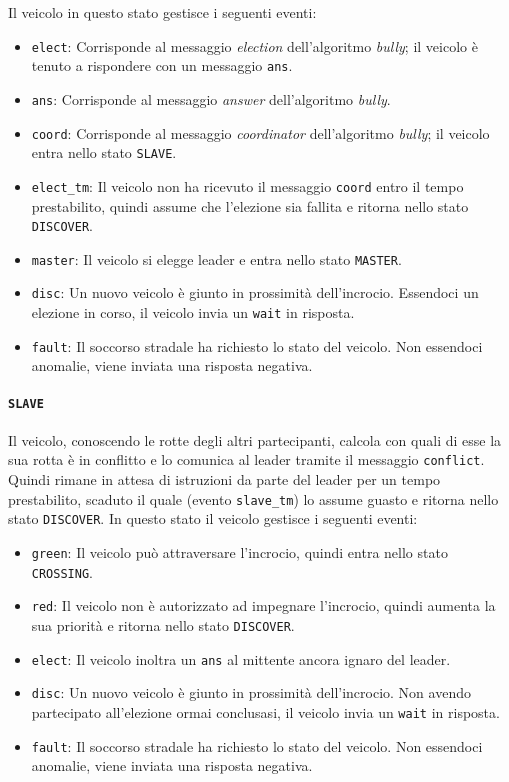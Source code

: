 \documentclass{memoir}
\begin{document}
Il veicolo in questo stato gestisce i seguenti eventi:
\begin{itemize}
\item \texttt{elect}: Corrisponde al messaggio \emph{election} dell'algoritmo
  \emph{bully}; il veicolo è tenuto a rispondere con un messaggio \texttt{ans}.
\item \texttt{ans}: Corrisponde al messaggio \emph{answer} dell'algoritmo
  \emph{bully}.
\item \texttt{coord}: Corrisponde al messaggio \emph{coordinator} dell'algoritmo
  \emph{bully}; il veicolo entra nello stato \texttt{SLAVE}.
\item \texttt{elect\_tm}: Il veicolo non ha ricevuto il messaggio \texttt{coord}
  entro il tempo prestabilito, quindi assume che l'elezione sia fallita e
  ritorna nello stato \texttt{DISCOVER}.
\item \texttt{master}: Il veicolo si elegge leader e entra nello stato
  \texttt{MASTER}.
\item \texttt{disc}: Un nuovo veicolo è giunto in prossimità dell'incrocio.
  Essendoci un elezione in corso, il veicolo invia un \texttt{wait} in risposta.
\item \texttt{fault}: Il soccorso stradale ha richiesto lo stato del veicolo.
  Non essendoci anomalie, viene inviata una risposta negativa.
\end{itemize}

\paragraph{\texttt{SLAVE}}
Il veicolo, conoscendo le rotte degli altri partecipanti, calcola con quali di
esse la sua rotta è in conflitto e lo comunica al leader tramite il messaggio
\texttt{conflict}. Quindi rimane in attesa di istruzioni da parte del leader per
un tempo prestabilito, scaduto il quale (evento \texttt{slave\_tm}) lo assume
guasto e ritorna nello stato \texttt{DISCOVER}. In questo stato il veicolo
gestisce i seguenti eventi:
\begin{itemize}
\item \texttt{green}: Il veicolo può attraversare l'incrocio, quindi entra nello
  stato \texttt{CROSSING}.
\item \texttt{red}: Il veicolo non è autorizzato ad impegnare l'incrocio, quindi
  aumenta la sua priorità e ritorna nello stato \texttt{DISCOVER}.
\item \texttt{elect}: Il veicolo inoltra un \texttt{ans} al mittente ancora
  ignaro del leader.
\item \texttt{disc}: Un nuovo veicolo è giunto in prossimità dell'incrocio. Non
  avendo partecipato all'elezione ormai conclusasi, il veicolo invia un
  \texttt{wait} in risposta.
\item \texttt{fault}: Il soccorso stradale ha richiesto lo stato del veicolo.
  Non essendoci anomalie, viene inviata una risposta negativa.
\end{itemize}
\end{document}
